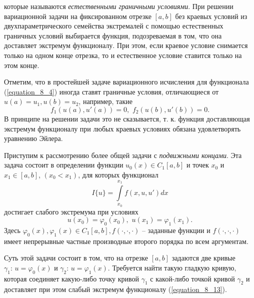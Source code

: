 	\newpage
	\noindent
	которые называются {\it естественными граничными условиями}. При решении вариационной задачи на фиксированном отрезке $[a, b]$ без краевых условий из двухпараметрического семейства экстремалей с помощью естественных граничных условий выбирается функция, подозреваемая в том, что она доставляет экстремум функционалу. При этом, если краевое условие снимается только на одном конце отрезка, то и естественное условие ставится только на этом конце.



	Отметим, что в простейшей задаче вариационного исчисления для функционала (\ref{equation_8_4}) иногда ставят граничные условия, отличающиеся от $u(a)=u_1, u(b)=u_2$, например, такие
$$f_1(u(a),u'(a))=0,\,\,f_2(u(b),u'(b))=0.$$
	В принципе на решении задачи это не сказывается, т. к. функция доставляющая  экстремум функционалу при любых краевых условиях обязана удовлетворять уравнению Эйлера.

	Приступим к рассмотрению более общей задачи с {\it подвижными концами}. Эта задача состоит в определении функции $u_0(x)\in C_1[a, b]$ и точек $x_0$ и $x_1\in [a,b]$, $(x_0<x_1)$, для которых функционал
	\begin{equation}
	\label{equation_8_13}
 		\textstyle I\{ u \}=\int\limits^{x_1}_{x_0} f(x,u,u')dx
	\end{equation}
	достигает слабого экстремума при условиях
	\begin{equation}
	\label{equation_8_14}
 		 u(x_0)=\varphi_0 (x_0),\,\,u(x_1)=\varphi_1 (x_1).
	\end{equation}
	Здесь $\varphi_0(x), \varphi_1(x) \in C_1[a, b], f(\cdot ,\cdot ,\cdot)$ – заданные функции и $f(\cdot ,\cdot ,\cdot)$ имеет непрерывные частные производные второго порядка по всем аргументам.

	Суть этой задачи состоит в том, что на отрезке $[a, b]$ задаются две кривые $\gamma_1:\, u= \varphi_0(x)$ и $\gamma_2:\, u= \varphi_1(x)$. Требуется найти такую гладкую кривую, которая соединяет какую-либо точку кривой $\gamma_1$ с какой-либо точкой кривой $\gamma_2$ и доставляет при этом слабый экстремум функционалу (\ref{equation_8_13}).

